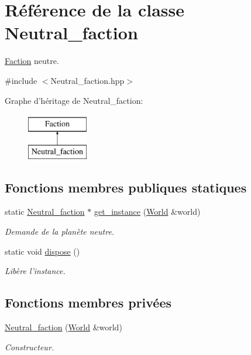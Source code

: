 \hypertarget{classNeutral__faction}{\section{Référence de la classe Neutral\-\_\-faction}
\label{classNeutral__faction}
}


\hyperlink{classFaction}{Faction} neutre.  




{\ttfamily \#include $<$Neutral\-\_\-faction.\-hpp$>$}

Graphe d'héritage de Neutral\-\_\-faction\-:\begin{figure}[H]
\begin{center}
\leavevmode
\includegraphics[height=2.000000cm]{classNeutral__faction}
\end{center}
\end{figure}
\subsection*{Fonctions membres publiques statiques}
\begin{DoxyCompactItemize}
\item 
static \hyperlink{classNeutral__faction}{Neutral\-\_\-faction} $\ast$ \hyperlink{classNeutral__faction_ae8e449bd58cfac78bc8cac249c7d1352}{get\-\_\-instance} (\hyperlink{classWorld}{World} \&world)
\begin{DoxyCompactList}\small\item\em Demande de la planète neutre. \end{DoxyCompactList}\item 
\hypertarget{classNeutral__faction_a1b42cda1fbc38de7408963f63e494d97}{static void \hyperlink{classNeutral__faction_a1b42cda1fbc38de7408963f63e494d97}{dispose} ()}\label{classNeutral__faction_a1b42cda1fbc38de7408963f63e494d97}

\begin{DoxyCompactList}\small\item\em Libère l'instance. \end{DoxyCompactList}\end{DoxyCompactItemize}
\subsection*{Fonctions membres privées}
\begin{DoxyCompactItemize}
\item 
\hyperlink{classNeutral__faction_aacd2a58a4ba2b640bac83a730bfaeeec}{Neutral\-\_\-faction} (\hyperlink{classWorld}{World} \&world)
\begin{DoxyCompactList}\small\item\em Constructeur. \end{DoxyCompactList}\end{DoxyCompactItemize}
